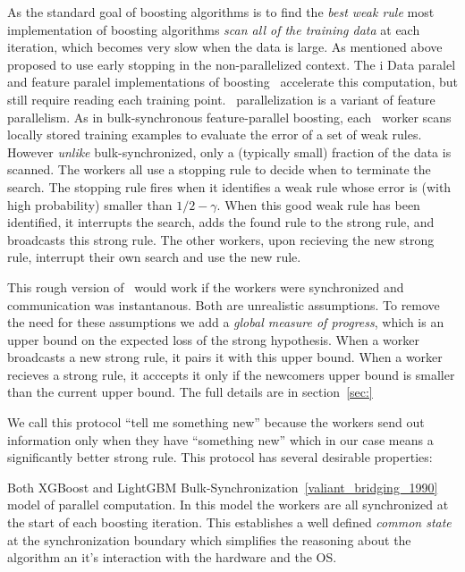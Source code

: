 As the standard goal of boosting algorithms is to find the {\em best
weak rule} most implementation of boosting algorithms {\em scan all
of the training data} at each iteration, which becomes very slow
when the data is large. As mentioned
above~\cite{domingo_scaling_2000,bradley_filterboost:_2007} proposed
to use early stopping in the non-parallelized context. The i
Data paralel and feature paralel
implementations of boosting~\cite{} accelerate this computation, but
still require reading each training point.  \tmsn\ parallelization is
a variant of feature parallelism. As in bulk-synchronous
feature-parallel boosting, each \tmsn\ worker scans locally stored
training examples to evaluate the error of a set of weak
rules. However {\em unlike} bulk-synchronized, only a (typically
small) fraction of the data is scanned.  The workers all use a
stopping rule to decide when to terminate the search. The stopping
rule fires when it identifies a weak rule whose error is (with high
probability) smaller than $1/2-\gamma$. When this good weak rule has
been identified, it interrupts the search, adds the found rule to the
strong rule, and broadcasts this strong rule. The other workers, upon
recieving the new strong rule, interrupt their own search and use the
new rule.

This rough version of \tmsn\ would work if the workers were
synchronized and communication was instantanous. Both are unrealistic
assumptions. To remove the need for these assumptions we add a {\em
  global measure of progress}, which is an upper bound on the expected
loss of the strong hypothesis. When a worker broadcasts a new strong
rule, it pairs it with this upper bound. When a worker recieves a
strong rule, it acccepts it only if the newcomers upper bound is
smaller than the current upper bound. The full details are in
section~\ref{sec:}

We call this protocol ``tell me something new'' because the workers
send out information only when they have ``something new'' which in
our case means a significantly better strong rule. This protocol has
several desirable properties:

Both XGBoost and LightGBM 
Bulk-Synchronization~\ref{valiant_bridging_1990} model of parallel
computation. In this model the workers are all synchronized at the
start of each boosting iteration. This establishes a well defined {\em
  common state} at the synchronization boundary which simplifies the
reasoning about the algorithm an it's interaction with the hardware
and the OS.

